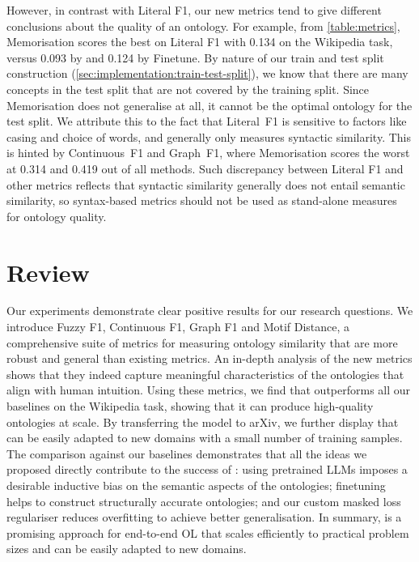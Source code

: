 However, in contrast with Literal F1, our new metrics tend to give different conclusions about the quality of an ontology. For example, from \cref{table:metrics}, Memorisation scores the best on Literal F1 with 0.134 on the Wikipedia task, versus 0.093 by \name and 0.124 by Finetune. By nature of our train and test split construction (\cref{sec:implementation:train-test-split}), we know that there are many concepts in the test split that are not covered by the training split. Since Memorisation does not generalise at all, it cannot be the optimal ontology for the test split. We attribute this to the fact that Literal~F1 is sensitive to factors like casing and choice of words, and generally only measures syntactic similarity. This is hinted by Continuous~F1 and Graph~F1, where Memorisation scores the worst at 0.314 and 0.419 out of all methods. Such discrepancy between Literal F1 and other metrics reflects that syntactic similarity generally does not entail semantic similarity, so syntax-based metrics should not be used as stand-alone measures for ontology quality.

\section{Review}

Our experiments demonstrate clear positive results for our research questions. We introduce Fuzzy F1, Continuous F1, Graph F1 and Motif Distance, a comprehensive suite of metrics for measuring ontology similarity that are more robust and general than existing metrics. An in-depth analysis of the new metrics shows that they indeed capture meaningful characteristics of the ontologies that align with human intuition. Using these metrics, we find that \name outperforms all our baselines on the Wikipedia task, showing that it can produce high-quality ontologies at scale. By transferring the model to arXiv, we further display that \name can be easily adapted to new domains with a small number of training samples. The comparison against our baselines demonstrates that all the ideas we proposed directly contribute to the success of \name:  using pretrained LLMs imposes a desirable inductive bias on the semantic aspects of the ontologies; finetuning helps to construct structurally accurate ontologies; and our custom masked loss regulariser reduces overfitting to achieve better generalisation. In summary, \name is a promising approach for end-to-end OL that scales efficiently to practical problem sizes and can be easily adapted to new domains.



